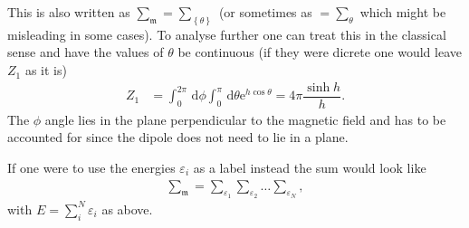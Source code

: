 \documentclass[a4paper,10pt]{article}
\newcommand{\td}{\,\text{d}}
\numberwithin{equation}{section}
\begin{document}
\begin{multicols}{2}
This is also written as $\sum_{\mathfrak{m}}^{}=\sum_{ \left\{\theta \right\}}^{}$ (or sometimes as $=\sum_{\theta }^{}$ which might be misleading in some cases).
To analyse further one can treat this in the classical sense and have the values of $\theta $ be continuous (if they were dicrete one would leave $Z_1$ as it is)
\begin{align} 
  Z_1 &= \int_{0}^{2\pi }\td \phi \int_{0}^{\pi }\td \theta \text{e}^{h\cos \theta }=4\pi \dfrac{\sinh h}{h}
.\end{align}
The $\phi $ angle lies in the plane perpendicular to the magnetic field and has to be accounted for since the dipole does not need to lie in a plane.

If one were to use the energies $\varepsilon _i$ as a label instead the sum would look like
\begin{align} 
  \sum_{\mathfrak{m}}^{}=\sum_{\varepsilon _1}^{}\sum_{\varepsilon _2}^{}\hdots \sum_{\varepsilon _N}^{}
,\end{align} 
with $E=\sum_{i}^{N}\varepsilon _i$ as above.


\end{multicols}
\end{document}
